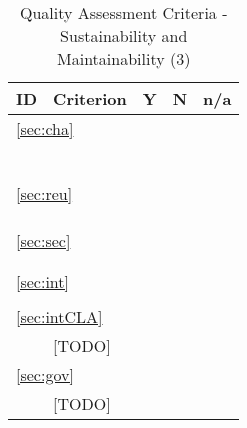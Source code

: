 \documentclass[a4paper,11pt]{article}
\begin{document}
\begin{table}[hbt]
	\begin{tabular}
		{ p{} | 
			p{} |
			p{} |
			p{} |
			p{} }
        \hline
        \textbf{ID} & \textbf{Criterion} & \textbf{Y} & \textbf{N} & \textbf{n/a} \\
        \hline 
		\multicolumn{5}{l}{\ref{sec:cha}{ }\nameref{sec:cha}} \\
		\hline	
		\hyperref[id:ch1]{\chOneID} & \chOneText & & & \\
		\hyperref[id:ch2]{\chTwoID} & \chTwoText & & & \\
		\hyperref[id:ch3]{\chThreeID} & \chThreeText & & & \\
		\hyperref[id:ch4]{\chFourID} & \chFourText & & & \\
		\hyperref[id:ch5]{\chFiveID} & \chFiveText & & & \\
		\hyperref[id:ch6]{\chSixID} & \chSixText & & & \\
		\hline
        \multicolumn{5}{l}{\ref{sec:reu}{ }\nameref{sec:reu}} \\
		\hline	
		\hyperref[id:r1]{\rOneID} & \rOneText & & & \\
		\hyperref[id:r2]{\rTwoID} & \rTwoText & & & \\
		\hyperref[id:r3]{\rThreeID} & \rThreeText & & & \\
		\hline
		\multicolumn{5}{l}{\ref{sec:sec}{ }\nameref{sec:sec}} \\
		\hline	
		\hyperref[id:sc1]{\scOneID} & \scOneText & & & \\
		\hyperref[id:sc2]{\scTwoID} & \scTwoText & & & \\
		\hline
		\multicolumn{5}{l}{\ref{sec:int}{ }\nameref{sec:int}} \\
		\hline	
		\hyperref[id:ip1]{\ipOneID} & \ipOneText & & & \\
		\hline
		\multicolumn{5}{l}{\ref{sec:intCLA}{ }\nameref{sec:intCLA}} \\
		\hline	
		&  [TODO] & & & \\
		\hline
		\multicolumn{5}{l}{\ref{sec:gov}{ }\nameref{sec:gov}} \\
		\hline	
		& [TODO] & & & \\
		\hline
\end{tabular}
	\caption{Quality Assessment Criteria - Sustainability and Maintainability (3)}
	\label{tab:criteriaSustMaint3}
\end{table}
\end{document}
